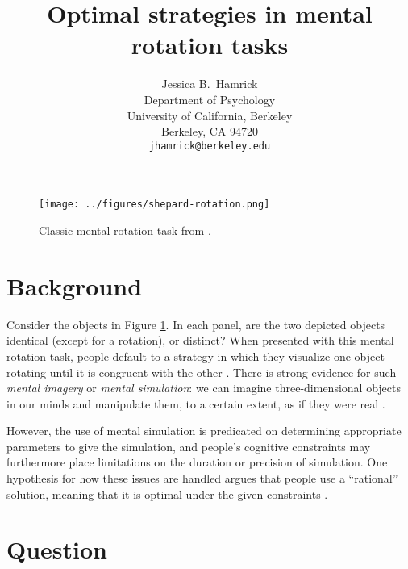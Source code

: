 \documentclass{article} %
\title{Optimal strategies in mental rotation tasks}
\author{Jessica B.~Hamrick\\
  Department of Psychology\\
  University of California, Berkeley\\
  Berkeley, CA 94720\\
  \texttt{jhamrick@berkeley.edu}}
\begin{document}
\maketitle


\begin{figure}[h]
  \begin{center}
    \texttt{[image: ../figures/shepard-rotation.png]}
  \end{center}
  \caption{Classic mental rotation task from \cite{Shepard1971}.}
  \label{fig:mental-rotation}
\end{figure}

\section{Background}



Consider the objects in Figure \ref{fig:mental-rotation}. In each
panel, are the two depicted objects identical (except for a rotation),
or distinct? When presented with this mental rotation task, people
default to a strategy in which they visualize one object rotating until
it is congruent with the other \cite{Shepard1971}. There is strong
evidence for such \textit{mental imagery} or \textit{mental
  simulation}: we can imagine three-dimensional objects in our minds
and manipulate them, to a certain extent, as if they were real
\cite{Kosslyn:2009tj}.

However, the use of mental simulation is predicated on determining
appropriate parameters to give the simulation, and people's cognitive
constraints may furthermore place limitations on the duration or
precision of simulation. One hypothesis for how these issues are
handled argues that people use a ``rational'' solution, meaning that
it is optimal under the given constraints
\cite{Lieder:2012wg,Vul:2009wy,Griffiths2012a}.

\section{Question}
\end{document}
